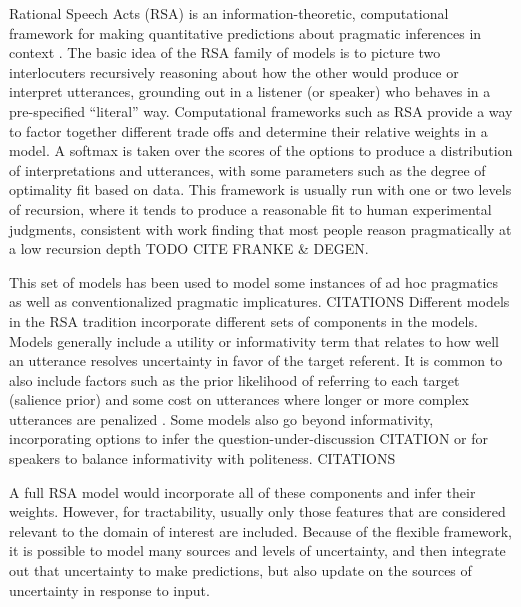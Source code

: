 \documentclass[]{article}
\begin{document}
Rational Speech Acts (RSA) is an information-theoretic, computational framework for making quantitative predictions about pragmatic inferences in context \cite{goodman2016, frank2012a}. The basic idea of the RSA family of models is to picture two interlocuters recursively reasoning about how the other would produce or interpret utterances, grounding out in a listener (or speaker) who behaves in a pre-specified ``literal'' way. Computational frameworks such as RSA provide a way to factor together different trade offs and determine their relative weights in a model. A softmax is taken over the scores of the options to produce a distribution of interpretations and utterances, with some parameters such as the degree of optimality fit based on data.  
This framework is usually run with one or two levels of recursion, where it tends to produce a reasonable fit to human experimental judgments, consistent with work finding that most people reason pragmatically at a low recursion depth TODO CITE FRANKE \& DEGEN. 

This set of models has been used to model some instances of ad hoc pragmatics as well as conventionalized pragmatic implicatures. CITATIONS
Different models in the RSA tradition incorporate different sets of components in the models. Models generally include a utility or informativity term that relates to how well an utterance resolves uncertainty in favor of the target referent.  It is common to also include factors such as the prior likelihood of referring to each target (salience prior) and some cost on utterances where longer or more complex utterances are penalized \cite{goodman2016}. Some models also go beyond informativity, incorporating options to infer the question-under-discussion CITATION or for speakers to balance informativity with politeness. CITATIONS

A full RSA model would incorporate all of these components and infer their weights. However, for tractability, usually only those features that are considered relevant to the domain of interest are included. Because of the flexible framework, it is possible to model many sources and levels of uncertainty, and then integrate out that uncertainty to make predictions, but also update on the sources of uncertainty in response to input. 
\end{document}
